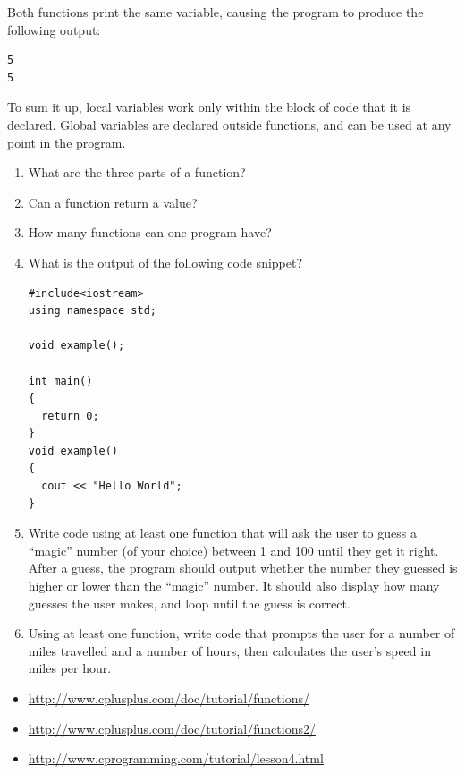 Both functions print the same variable, causing the program to produce the following output: 

\noindent\begin{minipage}{\linewidth}\begin{lstlisting}
5
5
\end{lstlisting}\end{minipage}

To sum it up, local variables work only within the block of code that it is declared. 
Global variables are declared outside functions, and can be used at any point in the program.



\begin{enumerate}
	\item What are the three parts of a function?
	\item Can a  function return a value?
	\item How many functions can one program have?
	\item What is the output of the following code snippet?

\noindent\begin{minipage}{\linewidth}\begin{lstlisting}
#include<iostream>
using namespace std;

void example();

int main()
{
  return 0;
}
void example()
{
  cout << "Hello World";  
}
\end{lstlisting}\end{minipage}

	\item Write code using at least one function that will ask the user to guess a ``magic'' number (of your choice) between 1 and 100 until they get it right. After a guess, the program should output whether the number they guessed is higher or lower than the ``magic'' number. It should also display how many guesses the user makes, and loop until the guess is correct.

  \item Using at least one function, write code that prompts the user for a number of miles travelled and a number of hours, then calculates the user's speed in miles per hour.

\end{enumerate}




\begin{itemize}
\item \url{http://www.cplusplus.com/doc/tutorial/functions/}
\item \url{http://www.cplusplus.com/doc/tutorial/functions2/}
\item \url{http://www.cprogramming.com/tutorial/lesson4.html}
\end{itemize}	




